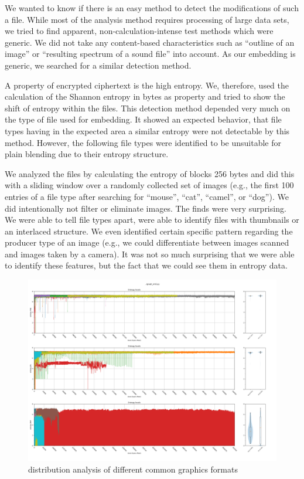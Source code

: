 We wanted to know if there is an easy method to detect the modifications of such a file. While most of the analysis method requires processing of large data sets, we tried to find apparent, non-calculation-intense test methods which were generic. We did not take any content-based characteristics such as ``outline of an image'' or ``resulting spectrum of a sound file'' into account. As our embedding is generic, we searched for a similar detection method.

A property of encrypted ciphertext is the high entropy. We, therefore, used the calculation of the Shannon entropy in bytes as property and tried to show the shift of entropy within the files. This detection method depended very much on the type of file used for embedding. It showed an expected behavior, that file types having in the expected area a similar entropy were not detectable by this method. However, the following file types were identified to be unsuitable for plain blending due to their entropy structure.

We analyzed the files by calculating the entropy of blocks 256 bytes and did this with a sliding window over a randomly collected set of images (e.g., the first 100 entries of a file type after searching for ``mouse'', ``cat'', ``camel'', or ``dog''). We did intentionally not filter or eliminate images. The finds were very surprising. We were able to tell file types apart, were able to identify files with thumbnails or an interlaced structure. We even identified certain specific pattern regarding the producer type of an image (e.g., we could differentiate between images scanned and images taken by a camera). It was not so much surprising that we were able to identify these features, but the fact that we could see them in entropy data.

\begin{figure}[ht]
	\includegraphics[width=\textwidth]{inc/statanalysis_graph}
	\caption{distribution analysis of different common graphics formats}
	\label{fig:statGraph}
\end{figure}

